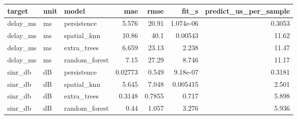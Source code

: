 \begin{tabular}{lllrrrr}
\toprule
target & unit & model & mae & rmse & fit_s & predict_us_per_sample \\
\midrule
delay_ms & ms & persistence & 5.576 & 20.91 & 1.074e-06 & 0.3053 \\
delay_ms & ms & spatial_knn & 10.86 & 40.1 & 0.00543 & 11.62 \\
delay_ms & ms & extra_trees & 6.659 & 23.13 & 2.238 & 11.47 \\
delay_ms & ms & random_forest & 7.15 & 27.29 & 8.746 & 11.17 \\
sinr_db & dB & persistence & 0.02773 & 0.549 & 9.18e-07 & 0.3181 \\
sinr_db & dB & spatial_knn & 5.645 & 7.048 & 0.005415 & 2.501 \\
sinr_db & dB & extra_trees & 0.3148 & 0.7855 & 0.717 & 5.898 \\
sinr_db & dB & random_forest & 0.44 & 1.057 & 3.276 & 5.936 \\
\bottomrule
\end{tabular}
